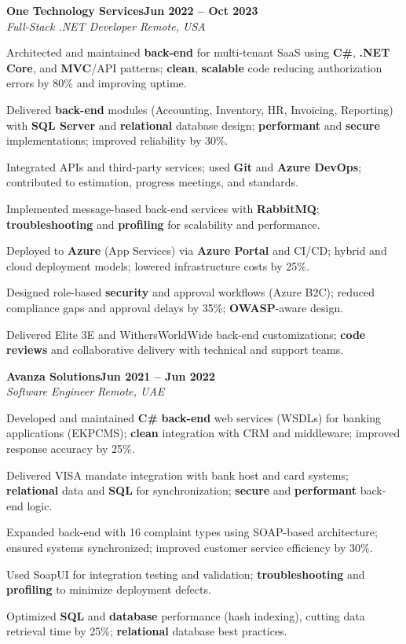 \documentclass[letterpaper,10pt]{article}
\newcommand{\headingBf}[2]{
  \hspace{10pt}\textbf{#1}\hfill\textbf{#2}\\
}
\newcommand{\headingIt}[2]{
  \hspace{10pt}\textit{#1}\hfill\textit{#2}\\
}
\newenvironment{resume_list}{
  \vspace{-7pt}
  \begin{itemize}[itemsep=-2px, parsep=1pt, leftmargin=30pt]
}{
  \end{itemize}
}
\begin{document}
\headingBf{One Technology Services}{Jun 2022 -- Oct 2023}
\headingIt{Full-Stack .NET Developer \hfill Remote, USA}{}
\begin{resume_list}
    \item Architected and maintained \textbf{back-end} for multi-tenant SaaS using \textbf{C\#}, \textbf{.NET Core}, and \textbf{MVC}/API patterns; \textbf{clean}, \textbf{scalable} code reducing authorization errors by 80\% and improving uptime.
    \item Delivered \textbf{back-end} modules (Accounting, Inventory, HR, Invoicing, Reporting) with \textbf{SQL Server} and \textbf{relational} database design; \textbf{performant} and \textbf{secure} implementations; improved reliability by 30\%.
    \item Integrated APIs and third-party services; used \textbf{Git} and \textbf{Azure DevOps}; contributed to estimation, progress meetings, and standards.
    \item Implemented message-based back-end services with \textbf{RabbitMQ}; \textbf{troubleshooting} and \textbf{profiling} for scalability and performance.
    \item Deployed to \textbf{Azure} (App Services) via \textbf{Azure Portal} and CI/CD; hybrid and cloud deployment models; lowered infrastructure costs by 25\%.
    \item Designed role-based \textbf{security} and approval workflows (Azure B2C); reduced compliance gaps and approval delays by 35\%; \textbf{OWASP}-aware design.
    \item Delivered Elite 3E and WithersWorldWide back-end customizations; \textbf{code reviews} and collaborative delivery with technical and support teams.
\end{resume_list}

\headingBf{Avanza Solutions}{Jun 2021 -- Jun 2022}
\headingIt{Software Engineer \hfill Remote, UAE}{}
\begin{resume_list}
    \item Developed and maintained \textbf{C\#} \textbf{back-end} web services (WSDLs) for banking applications (EKPCMS); \textbf{clean} integration with CRM and middleware; improved response accuracy by 25\%.
    \item Delivered VISA mandate integration with bank host and card systems; \textbf{relational} data and \textbf{SQL} for synchronization; \textbf{secure} and \textbf{performant} back-end logic.
    \item Expanded back-end with 16 complaint types using SOAP-based architecture; ensured systems synchronized; improved customer service efficiency by 30\%.
    \item Used SoapUI for integration testing and validation; \textbf{troubleshooting} and \textbf{profiling} to minimize deployment defects.
    \item Optimized \textbf{SQL} and \textbf{database} performance (hash indexing), cutting data retrieval time by 25\%; \textbf{relational} database best practices.
\end{resume_list}
\end{document}
